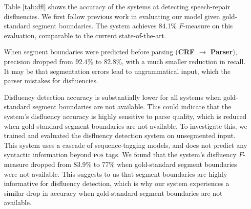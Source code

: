\documentclass[11pt,letterpaper]{article}
\begin{document}
Table \ref{tab:dfl} shows the accuracy of the systems at detecting speech-repair
disfluencies.  We first follow previous work in evaluating our model given
gold-standard segment boundaries.  The system achieves 84.1\% $F$-measure
on this evaluation, comparable to the current state-of-the-art.

When segment boundaries were predicted before parsing
(\textbf{CRF $\rightarrow$ Parser}), precision dropped from 92.4\% to 82.8\%,
with a much smaller reduction in recall.
It may be that segmentation errors lead to ungrammatical input, which the parser
mistakes for disfluencies.

Disfluency detection accuracy is substantially lower for all systems when
gold-standard segment boundaries are not available.  This could indicate that
the system's disfluency accuracy is highly sensitive to parse quality, which
is reduced when gold-standard segment boundaries are not available.
To investigate this, we trained and evaluated the \citet{qian:13} disfluency
detection system on unsegmented input.  This system uses a cascade of
sequence-tagging models, and does not predict any syntactic information beyond
\textsc{pos} tags.
We found that the \citeauthor{qian:13} system's disfluency $F$-measure dropped
from 83.9\% to 77\% when gold-standard segment boundaries were not available.
This suggests to us that segment boundaries are highly informative
for disfluency detection, which is why our system experiences a similar drop
in accuracy when gold-standard segment boundaries are not available.



%
%
%
%
\end{document}
